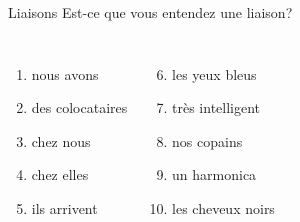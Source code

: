 \documentclass{beamer}
\begin{document}
  \begin{frame}{Liaisons}
    Est-ce que vous entendez une liaison? \\
    \begin{columns}
        \begin{enumerate}
          \item nous avons \underline{}
          \item des colocataires \underline{\uncover<3->{non}}
          \item chez nous \underline{}
          \item chez elles \underline{\uncover<5->{oui}}
          \item ils arrivent \underline{}
        \end{enumerate}
        \begin{enumerate}
          \setcounter{enumi}{5}
          \item les yeux bleus \underline{\uncover<7->{oui}}
          \item très intelligent \underline{}
          \item nos copains \underline{}
          \item un harmonica \underline{}
          \item les cheveux noirs \underline{}
        \end{enumerate}
    \end{columns}
  \end{frame}
\end{document}
